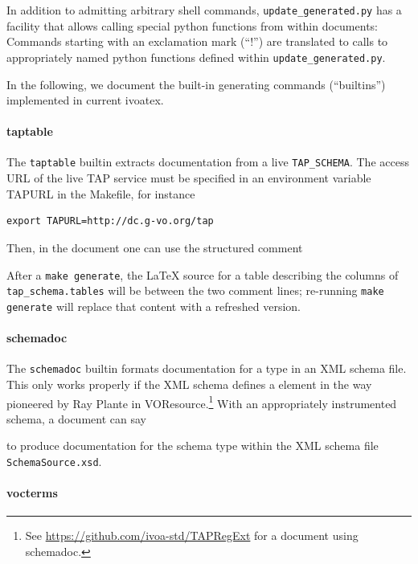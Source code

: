 \documentclass[11pt,a4paper]{ivoa}
\begin{document}
In addition to admitting arbitrary shell
commands, \texttt{update\_generated.py} has a facility that allows
calling special python functions from within documents: Commands
starting with an exclamation mark (``!'') are translated to calls to
appropriately named python functions defined within
\texttt{update\_generated.py}.

In the following, we document the built-in generating commands
(``builtins'') implemented in current ivoatex.

\paragraph{taptable}

The \texttt{taptable} builtin extracts documentation from a
live \texttt{TAP\_SCHEMA}.  The access URL of the
live TAP service must be specified in an environment variable TAPURL in
the Makefile, for instance

\begin{lstlisting}
export TAPURL=http://dc.g-vo.org/tap
\end{lstlisting}

Then, in the document one can use the structured comment



After a \texttt{make generate}, the LaTeX source for a table describing
the columns of \texttt{tap\_schema.tables} will be between the two
comment lines; re-running \texttt{make generate} will replace that
content with a refreshed version.

\paragraph{schemadoc}

The \texttt{schemadoc} builtin formats
documentation for a type in an XML schema file.  This only works
properly if the XML schema defines a  element in
the way pioneered by Ray Plante in
VOResource.\footnote{See
\url{https://github.com/ivoa-std/TAPRegExt} for a document using
schemadoc.}
With an appropriately instrumented schema, a document can say

to produce documentation for the schema type  within
the XML schema file \texttt{SchemaSource.xsd}.

\paragraph{vocterms}
\end{document}
